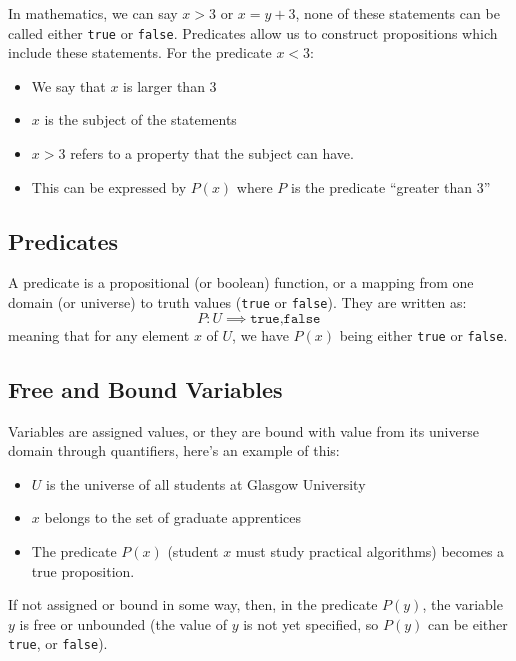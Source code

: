 In mathematics, we can say \(x>3\) or \(x=y+3\), none of these statements can be called either \texttt{true} or \texttt{false}.
Predicates allow us to construct propositions which include these statements.
For the predicate \(x<3\):
\begin{itemize}
    \item We say that \(x\) is larger than \(3\)
    \item \(x\) is the subject of the statements
    \item \(x>3\) refers to a property that the subject can have.
    \item This can be expressed by \(P(x)\) where \(P\) is the predicate ``greater than \(3\)''
\end{itemize}

\subsection{Predicates}\label{sub:predicates_pandq}

A predicate is a propositional (or boolean) function, or a mapping from one domain (or universe) to truth values (\texttt{true} or \texttt{false}).
They are written as:
\[
    P : U \implies {\texttt{true}, \texttt{false}}
\]
meaning that for any element \(x\) of \(U\), we have \(P(x)\) being either \texttt{true} or \texttt{false}.

\subsection{Free and Bound Variables}\label{sub:free_and_bound_variables}

Variables are assigned values, or they are bound with value from its universe domain through quantifiers, here's an example of this:
\begin{itemize}
    \item \(U\) is the universe of all students at Glasgow University
    \item \(x\) belongs to the set of graduate apprentices
    \item The predicate \(P(x)\) (student \(x\) must study practical algorithms) becomes a true proposition.
\end{itemize}
If not assigned or bound in some way, then, in the predicate \(P(y)\), the variable \(y\) is free or unbounded (the value of \(y\) is not yet specified, so \(P(y)\) can be either \texttt{true}, or \texttt{false}).



